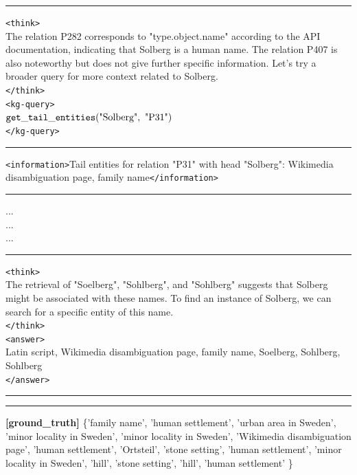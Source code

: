 \begin{table}[H]
\begin{reasonbox}[title=\framework{} Response Example — \dataset{T-REx}]
\vspace{0.5em}\hrule\vspace{0.5em}

\begin{blueblock}
\texttt{<think>} \\
The relation P282 corresponds to "type.object.name" according to the API documentation, indicating that Solberg is a human name. The relation P407 is also noteworthy but does not give further specific information. Let's try a broader query for more context related to Solberg. \\
\texttt{</think>} \\
\texttt{<kg-query>} \\
$\gettailentities(\text{"Solberg"},\ \text{"P31"})$ \\
\texttt{</kg-query>}
\end{blueblock}
\vspace{0.5em}\hrule\vspace{0.5em}
\texttt{<information>}Tail entities for relation "P31" with head "Solberg": Wikimedia disambiguation page, family name\texttt{</information>}
\vspace{0.5em}\hrule\vspace{0.5em}
...\\
...\\
...
\vspace{0.5em}\hrule\vspace{0.5em}

\begin{blueblock}
\texttt{<think>} \\
The retrieval of "Soelberg", "Sohlberg", and "Sohlberg" suggests that Solberg might be associated with these names. To find an instance of Solberg, we can search for a specific entity of this name. \\
\texttt{</think>} \\
\texttt{<answer>} \\
Latin script, Wikimedia disambiguation page, family name, Soelberg, Sohlberg, Sohlberg \\
\texttt{</answer>}

\end{blueblock}
\vspace{0.5em}\hrule\vspace{0.5em}
\vspace{0.1em}\hrule\vspace{0.5em}

\textbf{[ground\_truth]} \{'family name', 'human settlement', 'urban area in Sweden', 'minor locality in Sweden', 'minor locality in Sweden', 'Wikimedia disambiguation page', 'human settlement', 'Ortsteil', 'stone setting', 'human settlement', 'minor locality in Sweden', 'hill', 'stone setting', 'hill', 'human settlement' \}

\end{reasonbox}
\end{table}

